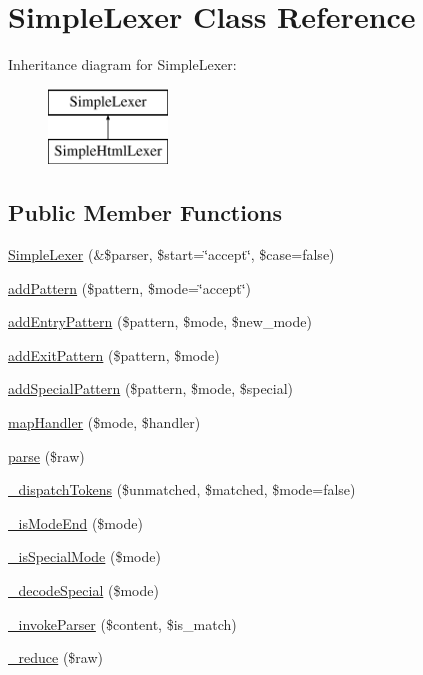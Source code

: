 \hypertarget{class_simple_lexer}{
\section{SimpleLexer Class Reference}
\label{class_simple_lexer}
}
Inheritance diagram for SimpleLexer:\begin{figure}[H]
\begin{center}
\leavevmode
\includegraphics[height=2.000000cm]{class_simple_lexer}
\end{center}
\end{figure}
\subsection*{Public Member Functions}
\begin{DoxyCompactItemize}
\item 
\hyperlink{class_simple_lexer_ae2bb586444d1d4ce1ef521b9f6b2bc75}{SimpleLexer} (\&\$parser, \$start=\char`\"{}accept\char`\"{}, \$case=false)
\item 
\hyperlink{class_simple_lexer_af0ef334972904054720c4ededafb9a24}{addPattern} (\$pattern, \$mode=\char`\"{}accept\char`\"{})
\item 
\hyperlink{class_simple_lexer_a4fd4c1124a0c5f7b16548351779deab7}{addEntryPattern} (\$pattern, \$mode, \$new\_\-mode)
\item 
\hyperlink{class_simple_lexer_a1cf1b9bc0c1d4b8b3dd465e31a6e1a15}{addExitPattern} (\$pattern, \$mode)
\item 
\hyperlink{class_simple_lexer_a59d5052dc25de99c53042847e8214c4f}{addSpecialPattern} (\$pattern, \$mode, \$special)
\item 
\hyperlink{class_simple_lexer_ad84116197560273d3fd02bd5e74dfe81}{mapHandler} (\$mode, \$handler)
\item 
\hyperlink{class_simple_lexer_afeceabe5e976b20b1e14fed952d79107}{parse} (\$raw)
\item 
\hyperlink{class_simple_lexer_a6dd073c1e7bbc77a4aafd9ac23bba172}{\_\-dispatchTokens} (\$unmatched, \$matched, \$mode=false)
\item 
\hyperlink{class_simple_lexer_a681e5891f263a352e8502f8196b541fc}{\_\-isModeEnd} (\$mode)
\item 
\hyperlink{class_simple_lexer_a419cf4b1b734f60af7a867f352decbd1}{\_\-isSpecialMode} (\$mode)
\item 
\hyperlink{class_simple_lexer_a64f7cbf4238a99aaa177d64dd3614b82}{\_\-decodeSpecial} (\$mode)
\item 
\hyperlink{class_simple_lexer_a287ef4470e221f5b348fbda97a88a70f}{\_\-invokeParser} (\$content, \$is\_\-match)
\item 
\hyperlink{class_simple_lexer_a7d11e9e2b45a5b585b57f82e760b5454}{\_\-reduce} (\$raw)
\end{DoxyCompactItemize}
